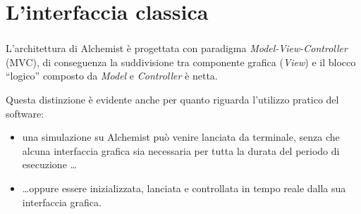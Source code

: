 \documentclass[%
]{beamer}
\newcommand{\engEmph}[1] {\emph{\foreignlanguage{english}#1}}
\begin{document}
    \section{L'interfaccia classica}\label{sec:old}
    \begin{frame}
        \frametitle{\insertsection}
        L'architettura di Alchemist è progettata con paradigma \engEmph{Model-View-Controller}~\cite{mvc} (MVC), di conseguenza la suddivisione tra componente grafica (\engEmph{View}) e il blocco ``logico'' composto da \engEmph{Model} e \engEmph{Controller} è netta.

        \medskip
        \pause

        Questa distinzione è evidente anche per quanto riguarda l'utilizzo pratico del software:

        \begin{itemize}[<+(1)->]
          \item
              una simulazione su Alchemist può venire lanciata da terminale, senza che alcuna interfaccia grafica sia necessaria per tutta la durata del periodo di esecuzione \ldots

          \item
              \ldots oppure essere inizializzata, lanciata e controllata in tempo reale dalla sua interfaccia grafica.
        \end{itemize}
    \end{frame}

    \begin{frame}
        \frametitle{\insertsection}
            \centering
    \end{frame}
\end{document}
